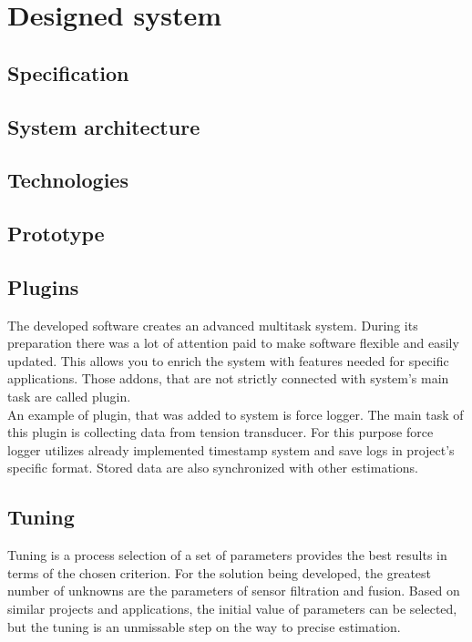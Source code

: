 \chapter{Designed system}

\section{Specification}


\section{System architecture}

\section{Technologies}

\section{Prototype}

\section{Plugins}

The developed software creates an advanced multitask system. During its preparation there was a lot of attention paid to make software flexible and easily updated. This allows you to enrich the system with features needed for specific applications. Those addons, that are not strictly connected with system's main task are called plugin.\\

An example of plugin, that was added to system is force logger. The main task of this plugin is collecting data from tension transducer. For this purpose force logger utilizes already implemented timestamp system and save logs in project's specific format. Stored data are also synchronized with other estimations.

\section{Tuning}

Tuning is a process selection of a set of parameters provides the best results in terms of the chosen criterion. For the solution being developed, the greatest number of unknowns are the parameters of sensor filtration and fusion. Based on similar projects and applications, the initial value of parameters can be selected, but the tuning is an unmissable step on the way to precise estimation.\\

